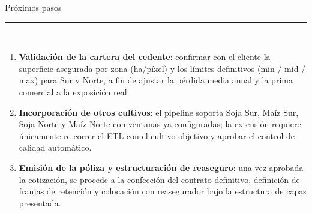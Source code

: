 \documentclass[aspectratio=169,11pt]{beamer}
\begin{document}
\begin{frame}{Próximos pasos}
  \textcolor{sgreen}{\rule{\linewidth}{0.8pt}}\\[6pt]
  \begin{enumerate}\footnotesize
    \item[\textcolor{sgreen}{\bfseries 1.}]
      \textbf{Validación de la cartera del cedente}: confirmar con el cliente la
      superficie asegurada por zona (ha/píxel) y los límites definitivos
      (min / mid / max) para Sur y Norte, a fin de ajustar la pérdida media anual
      y la prima comercial a la exposición real.

    \vspace{0.5em}
    \item[\textcolor{sgreen}{\bfseries 2.}]
      \textbf{Incorporación de otros cultivos}: el pipeline soporta Soja Sur, Maíz Sur,
      Soja Norte y Maíz Norte con ventanas ya configuradas; la extensión requiere
      únicamente re-correr el ETL con el cultivo objetivo y aprobar el control
      de calidad automático.

    \vspace{0.5em}
    \item[\textcolor{sgreen}{\bfseries 3.}]
      \textbf{Emisión de la póliza y estructuración de reaseguro}: una vez aprobada
      la cotización, se procede a la confección del contrato definitivo,
      definición de franjas de retención y colocación con reasegurador
      bajo la estructura de capas presentada.
  \end{enumerate}
\end{frame}

\begin{frame}[plain]
\end{frame}
\end{document}

